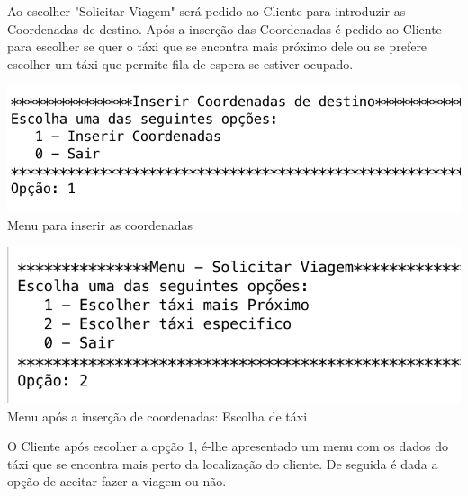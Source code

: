 Ao escolher "Solicitar Viagem" será pedido ao Cliente para introduzir as Coordenadas de destino. Após a inserção das Coordenadas é pedido ao Cliente para escolher se quer o táxi que se encontra mais próximo dele ou se prefere escolher um táxi que permite fila de espera se estiver ocupado. 

\noindent\begin{minipage}[b]{.5\textwidth}
	\includegraphics[scale=0.55]{imagem/inserirDestino}
	\small{Menu para inserir as coordenadas}
\end{minipage} 
\hfill
\begin{minipage}[b]{.45\textwidth}
	\includegraphics[scale=0.55]{imagem/coorInseridas}
	\small{Menu após a inserção de coordenadas: Escolha de táxi}
\end{minipage}
\hfill


O Cliente após escolher a opção 1, é-lhe apresentado um menu com os dados do táxi que se encontra mais perto da localização do cliente. De seguida é dada a opção de aceitar fazer a viagem ou não. 

